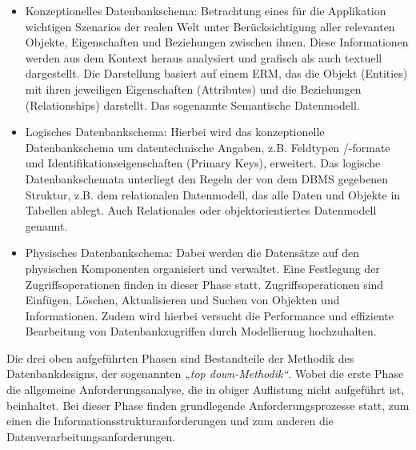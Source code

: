 \begin{itemize}
    \item Konzeptionelles Datenbankschema: Betrachtung eines für die Applikation wichtigen Szenarios der realen Welt unter Berücksichtigung 
    aller relevanten Objekte, Eigenschaften und Beziehungen zwischen ihnen. Diese Informationen werden aus dem Kontext heraus analysiert 
    und grafisch als auch textuell dargestellt. Die Darstellung basiert auf einem \ac{ERM}, das die Objekt (Entities) mit ihren jeweiligen 
    Eigenschaften (Attributes) und die Beziehungen (Relationships) darstellt. Das sogenannte Semantische Datenmodell.
    \item Logisches Datenbankschema: Hierbei wird das konzeptionelle Datenbankschema um datentechnische Angaben, z.B. Feldtypen /-formate 
    und Identifikationseigenschaften (Primary Keys), erweitert. Das logische Datenbankschemata unterliegt den Regeln der von dem \ac{DBMS}
    gegebenen Struktur, z.B. dem relationalen Datenmodell, das alle Daten und Objekte in Tabellen ablegt. Auch Relationales oder 
    objektorientiertes Datenmodell genannt.
    \item Physisches Datenbankschema: Dabei werden die Datensätze auf den physischen Komponenten organisiert und verwaltet. Eine Festlegung 
    der Zugriffsoperationen finden in dieser Phase statt. Zugriffsoperationen sind Einfügen, Löschen, Aktualisieren und Suchen von Objekten 
    und Informationen. Zudem wird hierbei versucht die Performance und effiziente Bearbeitung von Datenbankzugriffen durch Modellierung hochzuhalten.
\end{itemize}  
Die drei oben aufgeführten Phasen sind Bestandteile der Methodik des Datenbankdesigns, der sogenannten \textit{„top down-Methodik“}. 
Wobei die erste Phase die allgemeine Anforderungsanalyse, die in obiger Auflistung nicht aufgeführt ist, beinhaltet. Bei dieser Phase finden 
grundlegende Anforderungsprozesse statt, zum einen die Informationsstrukturanforderungen und zum anderen die Datenverarbeitungsanforderungen. 